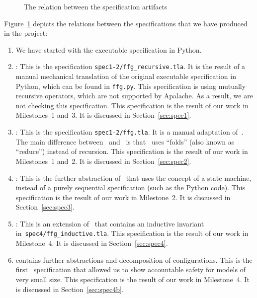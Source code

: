 \begin{figure}
  
  \caption{The relation between the specification artifacts}\label{fig:artifacts}
\end{figure}

Figure~\ref{fig:artifacts} depicts the relations between the specifications
that we have produced in the project:

\begin{enumerate}
    \item We have started with the executable specification in Python.

    \item \SpecOne{}: This is the specification
        \texttt{spec1-2/ffg\_recursive.tla}. It is the result of a manual
        mechanical translation of the original executable specification in
        Python, which can be found in \texttt{ffg.py}. This specification is
        using mutually recursive operators, which are not supported by
        Apalache. As a result, we are not checking this specification. This
        specification is the result of our work in Milestones~1 and~3.
        It is discussed in Section~\ref{sec:spec1}.

    \item \SpecTwo{}: This is the specification \texttt{spec1-2/ffg.tla}. It is
        a manual adaptation of~\SpecOne{}. The main difference
        between~\SpecTwo{} and~\SpecOne{} is that~\SpecTwo{} uses ``folds''
        (also known as ``reduce'') instead of recursion. This specification is
        the result of our work in Milestones~1 and~2. It is discussed in
        Section~\ref{sec:spec2}.

    \item \SpecThree{}: This is the further abstraction of~\SpecTwo{} that uses
        the concept of a state machine, instead of a purely sequential
        specification (such as the Python code). This specification is the
        result of our work in Milestone~2. It is discussed in
        Section~\ref{sec:spec3}.

    \item \SpecFour{}: This is an extension of~\SpecThree{} that contains
        an inductive invariant in~\texttt{spec4/ffg\_inductive.tla}.
        This specification is the result of our work in Milestone~4.
        It is discussed in Section~\ref{sec:spec4}.

    \item \SpecFourB{} contains further abstractions and decomposition of
        configurations. This is the first~\tlap{} specification that allowed us
        to show accountable safety for models of very small size. This
        specification is the result of our work in Milestone~4.
        It is discussed in Section~\ref{sec:spec4b}.


\end{enumerate}
